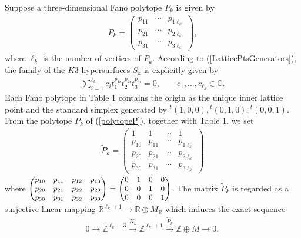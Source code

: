 \documentclass[10pt]{article}
\begin{document}
Suppose a three-dimensional Fano polytope $P_k$ is given by
\begin{align}\label{polytopeP}
P_k=\begin{pmatrix} p_{11} & \cdots & p_{1\ell_k} \\ p_{21} & \cdots & p_{2\ell_k} \\ p_{31} & \cdots & p_{3\ell_k} \end{pmatrix},
\end{align}
 where $\ell_k$ is the number of vertices of $P_k$.
According to (\ref{LatticePtsGenerators}),
the family of the $K3$ hypersurfaces $S_k$ is explicitly given by
\begin{align}\label{EquationA}
\sum_{i=1}^{\ell_k} c_i t_1^{p_{1i}} t_2^{p_{2i}} t_3^{p_{3i}}=0, \quad \quad  c_1, \ldots, c_{\ell_k} \in \mathbb{C}.
\end{align}
Each Fano polytope in Table 1 contains the origin as the unique inner lattice point and the standard simplex generated by ${}^t (1,0,0), {}^t (0,1,0), {}^t (0,0,1)$.
From the polytope $P_k$ of (\ref{polytopeP}), together with Table 1,
we set
\begin{align}
\widetilde{P}_k=
\begin{pmatrix}
1&1&\cdots &1 \\
p_{10}&p_{11}& \cdots &p_{1\ell_k} \\
p_{20}&p_{21}& \cdots &p_{2\ell_k} \\
p_{30}&p_{31}& \cdots &p_{3\ell_k} 
\end{pmatrix}
\end{align}
 where ${\small \begin{pmatrix} p_{10} & p_{11} & p_{12} & p_{13} \\ p_{20} & p_{21} & p_{22} & p_{23} \\ p_{30} & p_{31} & p_{32} & p_{33}  \end{pmatrix} =\begin{pmatrix}  0&1&0&0 \\ 0&0&1&0 \\ 0&0&0&1 \end{pmatrix} }$.
 The matrix $\widetilde{P}_k$ is regarded as a surjective linear mapping $\mathbb{R}^{\ell_k+1} \rightarrow \mathbb{R} \oplus M_\mathbb{R} $
 which induces the exact sequence 
 \begin{align}\label{Sequence1}
0 \rightarrow \mathbb{Z}^{\ell_k-3} \overset{K_k} \longrightarrow \mathbb{Z}^{\ell_k+1} \overset{\widetilde{P}_k}\longrightarrow \mathbb{Z} \oplus M \rightarrow 0,
 \end{align}
\end{document}
